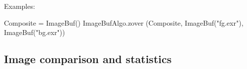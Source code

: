 \smallskip
\noindent Examples:
\begin{code}
    Composite = ImageBuf()
    ImageBufAlgo.zover (Composite, ImageBuf("fg.exr"), ImageBuf("bg.exr"))
\end{code}
\apiend



\subsection{Image comparison and statistics}
\label{sec:iba:py:stats}

\begin{comment}   %

\apiitem{bool ImageBufAlgo.{\ce computePixelStats} (PixelStats \&stats, src, \\
   \bigspc\bigspc  roi=ROI.All, nthreads=0)}
\index{ImageBufAlgo!computePixelStats} \indexapi{computePixelStats}

Compute statistics about the ROI of the image {\cf src}, storing results
in {\cf stats} (each of the vectors within {\cf stats} will be
automatically resized to the number of channels in the image).  A return
value of {\cf true} indicates success, {\cf false} indicates that it was
not possible to complete the operation.
 The {\cf PixelStats} structure is defined as follows:
\begin{code}
struct PixelStats {
    std::vector<float> min
    std::vector<float> max
    std::vector<float> avg
    std::vector<float> stddev
    std::vector<imagesize_t> nancount
    std::vector<imagesize_t> infcount
    std::vector<imagesize_t> finitecount
    std::vector<double> sum, sum2  # for intermediate calculation
}
\end{code}

\smallskip
\noindent Examples:
\begin{code}
    ImageBuf A ("a.exr")
    ImageBufAlgo.PixelStats stats
    ImageBufAlgo.computePixelStats (stats, A)
    for (int c = 0;  c < A.nchannels();  ++c) {
        print "Channel ", c, ":"
        print "   min = ", stats.min[c]
        print "   max = ", stats.max[c]
        print "   average = ", stats.avg[c]
        print "   standard deviation  = ", stats.stddev[c]
        print "   # NaN values    = ", stats.nancount[c]
        print "   # Inf values    = ", stats.infcount[c]
        print "   # finite values = ", stats.finitecount[c]
    }
\end{code}
\apiend
\end{comment}


